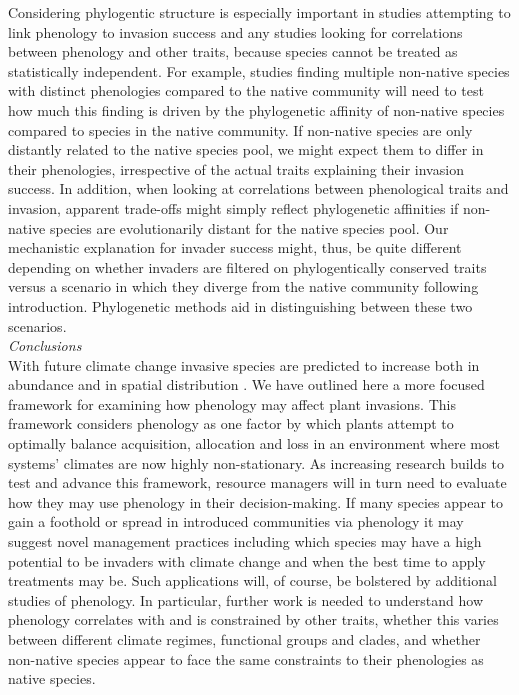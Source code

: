 \documentclass[11pt,a4paper,oneside]{article}
\begin{document}
Considering phylogentic structure is especially important in studies attempting to link phenology to invasion success and any studies looking for correlations between phenology and other traits, because species cannot be treated as statistically independent. For example, studies finding multiple non-native species with distinct phenologies compared to the native community will need to test how much this finding is driven by the phylogenetic affinity of non-native species compared to species in the native community. If non-native species are only distantly related to the native species pool, we might expect them to differ in their phenologies, irrespective of the actual traits explaining their invasion success. In addition, when looking at correlations between phenological traits and invasion, apparent trade-offs might simply reflect phylogenetic affinities if non-native species are evolutionarily distant for the native species pool. Our mechanistic explanation for invader success might, thus, be quite different depending on whether invaders are filtered on phylogentically conserved traits versus a scenario in which they diverge from the native community following introduction. Phylogenetic methods aid in distinguishing between these two scenarios. \\

\noindent \emph{Conclusions}\\
With future climate change invasive species are predicted to increase both in abundance and in spatial distribution \citep{ipcc2007summary,bradley2010}. We have outlined here a more focused framework for examining how phenology may affect plant invasions. This framework considers phenology as one factor by which plants attempt to optimally balance acquisition, allocation and loss in an environment where most systems' climates are now highly non-stationary. As increasing research builds to test and advance this framework, resource managers will in turn need to evaluate how they may use phenology in their decision-making. If many species appear to gain a foothold or spread in introduced communities via phenology it may suggest novel management practices including which species may have a high potential to be invaders with climate change and when the best time to apply treatments may be. Such applications will, of course, be bolstered by additional studies of phenology. In particular, further work is needed to understand how phenology correlates with and is constrained by other traits, whether this varies between different climate regimes, functional groups and clades, and whether non-native species appear to face the same constraints to their phenologies as native species. \\
\end{document}
